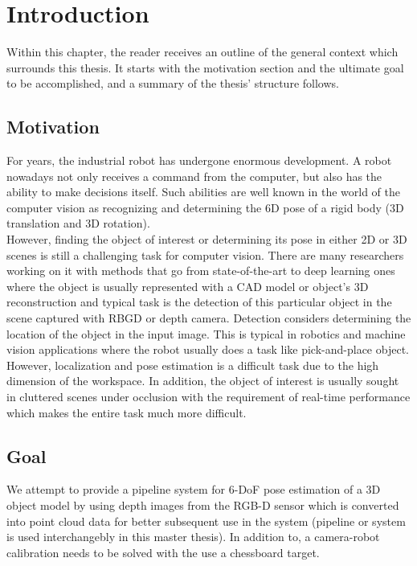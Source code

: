 \chapter{Introduction}
\label{chap:intro}

Within this chapter, the reader receives an outline of the general context which surrounds this thesis. It starts with the motivation section and the ultimate goal to be accomplished, and a summary of the thesis' structure follows. 

\section{Motivation}

For years, the industrial robot has undergone enormous development. A robot nowadays not only receives a command from the computer, but also has the ability to make decisions itself. Such abilities are well known in the world of the computer vision as recognizing and determining the 6D pose of a rigid body (3D translation and 3D rotation). \\
However, finding the object of interest or determining its pose in either 2D or 3D scenes is still a challenging task for computer vision. There are many researchers working on it with methods that go from state-of-the-art to deep learning ones where the object is usually represented with a CAD model or object's 3D reconstruction and typical task is the detection of this particular object in the scene captured with RBGD or depth camera. Detection considers determining the location of the object in the input image. This is typical in robotics and machine vision applications where the robot usually does a task like pick-and-place object. However, localization and pose estimation is a difficult task due to the high dimension of the workspace. In addition, the object of interest is usually sought in cluttered scenes under occlusion with the requirement of real-time performance which makes the entire task much more difficult.

\section{Goal}
\iffalse
We attempt to provide a pipeline system for 6-DoF pose estimation of a 3D object model by using depth images from the RGB-D sensor which is converted into point cloud data for better subsequent use in the system (pipeline or system is used interchangebly in this master thesis). In addition to, a camera-robot calibration needs to be solved with the use a chessboard target.

